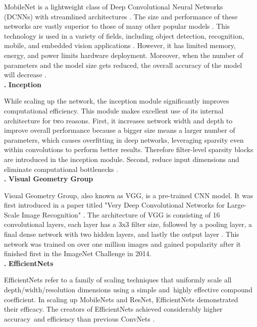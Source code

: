 \documentclass[12pt]{diazessay}
\newcommand{\RomanNumeralCaps}[1]
{\MakeUppercase{\romannumeral #1}}
\begin{document}
    MobileNet is a lightweight class of Deep Convolutional Neural Networks (DCNNs) with streamlined architectures \cite{ghoury2019real}\cite{howard2017mobilenets}. The size and performance of these networks are vastly superior to those of many other popular models \cite{ghoury2019real}. This technology is used in a variety of fields, including object detection, recognition, mobile, and embedded vision applications \cite{ghoury2019real}\cite{sinha2019thin}. However, it has limited memory, energy, and power limits hardware deployment. Moreover, when the number of parameters and the model size gets reduced, the overall accuracy of the model will decrease \cite{sinha2019thin}.
    \\
    \textbf{\RomanNumeralCaps { 2. }}  \textbf{Inception} 
    
    While scaling up the network, the inception module significantly improves computational efficiency. This module makes excellent use of its internal architecture for two reasons. First, it increases network width and depth to improve overall performance because a bigger size means a larger number of parameters, which causes overfitting in deep networks, leveraging sparsity even within convolutions to perform better results. Therefore filter-level sparsity blocks are introduced in the inception module. Second, reduce input dimensions and eliminate computational bottlenecks \cite{pouyanfar2017efficient}.
    \\
    \textbf{\RomanNumeralCaps { 3. }}  \textbf{Visual Geometry Group} 
    
    Visual Geometry Group, also known as VGG, is a pre-trained CNN model. It was first introduced in a paper titled "Very Deep Convolutional Networks for Large-Scale Image Recognition" \cite{Simonyan2014}. The architecture of VGG is consisting of 16 convolutional layers, each layer has a 3x3 filter size, followed by a pooling layer, a final dense network with two hidden layers, and lastly the output layer \cite{Simonyan2014}. This network was trained on over one million images and gained popularity after it finished first in the ImageNet Challenge in 2014.
    \\
    \textbf{\RomanNumeralCaps { 4. }}  \textbf{EfficientNets}
    
    EfficientNets refer to a family of scaling techniques that uniformly scale all depth/width/resolution dimensions using a simple and highly effective compound coefficient. In scaling up MobileNets and ResNet, EfficientNets demonstrated their efficacy. The creators of EfficientNets achieved considerably higher accuracy and efficiency than previous ConvNets \cite{https://doi.org/10.48550/arxiv.1905.11946}.
    
\end{document}
